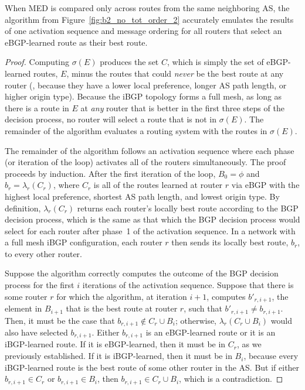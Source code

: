 \begin{theorem}\label{t:ebgp}
When MED is compared only across routes from the same
neighboring AS, the algorithm from Figure~\ref{fig:b2_no_tot_order_2}
accurately emulates the results of one activation sequence and message
ordering for all routers that select an eBGP-learned route as their best
route.
\end{theorem}

\begin{proof}
Computing $\sigma(E)$ produces the set $C$, which is simply the set of
eBGP-learned routes, $E$, minus the routes that could
{\em never} be the best route at any router (\ie, because they have
a lower local preference, longer AS path length, or higher origin type).
Because the iBGP topology forms a full mesh, as long as there is a
route in $E$ at {\em any} router that is better in the first three
steps of the decision process, no router will select a route that is
not in $\sigma(E)$.  The remainder of the algorithm evaluates a
routing system with the routes in $\sigma(E)$.

The remainder of the algorithm follows an activation sequence where each
phase (or iteration of the loop) activates all of the routers
simultaneously.  The proof proceeds by induction.  After the first
iteration of the loop, $B_0 = \phi$ and $b_r = \lambda_r(C_r)$, where
$C_r$ is all of the routes learned at router $r$ via eBGP with the
highest local preference, shortest AS path length, and lowest origin
type.  By definition, $\lambda_r(C_r)$ returns each router's locally
best route according to the BGP decision process, which is the same as
that which the BGP decision process would select for each router after
phase~1 of the activation sequence.  In a network with a full mesh iBGP
configuration, each router $r$ then sends its locally best route, $b_r$,
to every other router.

Suppose the algorithm correctly computes the outcome of the BGP decision
process for the first $i$ iterations of the activation sequence.
Suppose that there is some router $r$ for which the algorithm, at
iteration $i+1$, computes $b'_{r,i+1}$, the element in $B_{i+1}$ that is
the best route at router $r$, such that $b'_{r,i+1} \neq b_{r,i+1}$.
Then, it must be the case that $b_{r,i+1} \not\in C_r \cup B_i$;
otherwise, $\lambda_r(C_r \cup B_i)$ would also have selected
$b_{r,i+1}$.  Either $b_{r,i+1}$ is an eBGP-learned route or it is an
iBGP-learned route.  If it is eBGP-learned, then it must be in $C_r$, as
we previously established.  If it is iBGP-learned, then it must be in
$B_i$, because every iBGP-learned route is the best route of some other
router in the AS.  But if either $b_{r,i+1}\in C_r$ or $b_{r,i+1}\in
B_i$, then $b_{r,i+1} \in C_r \cup B_i$, which is a contradiction.


\end{proof}
